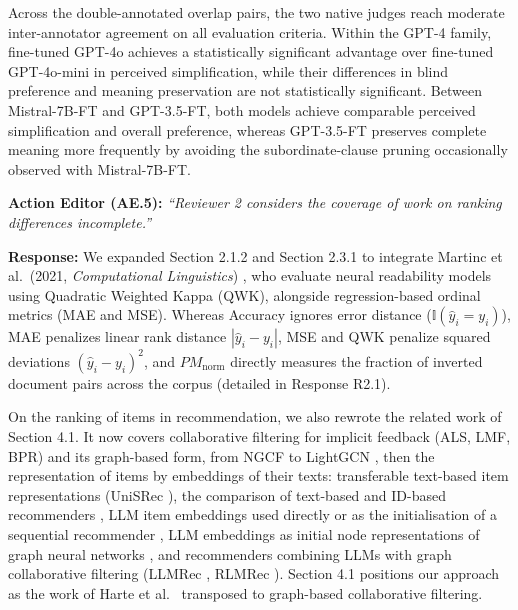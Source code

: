 \documentclass[11pt,a4paper]{article}
\newcommand{\mm}[1]{#1}
\begin{document}
Across the double-annotated overlap pairs, the two native judges reach moderate inter-annotator agreement on all evaluation criteria. Within the GPT-4 family, fine-tuned GPT-4o achieves a statistically significant advantage over fine-tuned GPT-4o-mini in perceived simplification, while their differences in blind preference and meaning preservation are not statistically significant. Between Mistral-7B-FT and GPT-3.5-FT, both models achieve comparable perceived simplification and overall preference, whereas GPT-3.5-FT preserves complete meaning more frequently by avoiding the subordinate-clause pruning occasionally observed with Mistral-7B-FT.

\begin{reviewbox}
\textbf{Action Editor (AE.5):} \textit{``Reviewer 2 considers the coverage of work on ranking differences incomplete.''}
\end{reviewbox}

\noindent\textbf{Response:}
We expanded Section 2.1.2\mm{ and} Section 2.3.1 to integrate Martinc et al.\ (2021, \textit{Computational Linguistics}) \cite{martinc2021supervised}, who evaluate neural readability models using Quadratic Weighted Kappa (QWK), alongside regression-based ordinal metrics (MAE and MSE). Whereas Accuracy ignores error distance ($\mathbb{I}(\hat{y}_i = y_i)$), MAE penalizes linear rank distance $|\hat{y}_i - y_i|$, MSE and QWK penalize squared deviations $(\hat{y}_i - y_i)^2$, and $PM_{\text{norm}}$ directly measures the fraction of inverted document pairs across the corpus (detailed in Response R2.1).

\mm{On the ranking of items in recommendation, we also rewrote the related work of Section 4.1. It now covers collaborative filtering for implicit feedback (ALS, LMF, BPR) and its graph-based form, from NGCF \cite{wang2019ngcf} to LightGCN \cite{lightgcn}, then the representation of items by embeddings of their texts: transferable text-based item representations (UniSRec \cite{hou2022unisrec}), the comparison of text-based and ID-based recommenders \cite{yuan2023where}, LLM item embeddings used directly or as the initialisation of a sequential recommender \cite{harte2023leveraging}, LLM embeddings as initial node representations of graph neural networks \cite{chen2024exploring}, and recommenders combining LLMs with graph collaborative filtering (LLMRec \cite{wei2024llmrec}, RLMRec \cite{ren2024rlmrec}). Section 4.1 positions our approach as the work of Harte et al.\ \cite{harte2023leveraging} transposed to graph-based collaborative filtering.}
\end{document}
